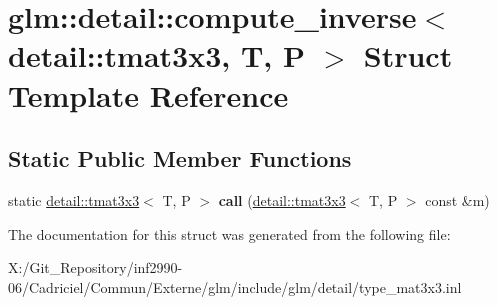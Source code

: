\hypertarget{structglm_1_1detail_1_1compute__inverse_3_01detail_1_1tmat3x3_00_01_t_00_01_p_01_4}{\section{glm\-:\-:detail\-:\-:compute\-\_\-inverse$<$ detail\-:\-:tmat3x3, T, P $>$ Struct Template Reference}
\label{structglm_1_1detail_1_1compute__inverse_3_01detail_1_1tmat3x3_00_01_t_00_01_p_01_4}
}
\subsection*{Static Public Member Functions}
\begin{DoxyCompactItemize}
\item 
\hypertarget{structglm_1_1detail_1_1compute__inverse_3_01detail_1_1tmat3x3_00_01_t_00_01_p_01_4_ac49eb426ffee6a5ebf1ee02e45c0a159}{static \hyperlink{structglm_1_1detail_1_1tmat3x3}{detail\-::tmat3x3}$<$ T, P $>$ {\bfseries call} (\hyperlink{structglm_1_1detail_1_1tmat3x3}{detail\-::tmat3x3}$<$ T, P $>$ const \&m)}\label{structglm_1_1detail_1_1compute__inverse_3_01detail_1_1tmat3x3_00_01_t_00_01_p_01_4_ac49eb426ffee6a5ebf1ee02e45c0a159}

\end{DoxyCompactItemize}


The documentation for this struct was generated from the following file\-:\begin{DoxyCompactItemize}
\item 
X\-:/\-Git\-\_\-\-Repository/inf2990-\/06/\-Cadriciel/\-Commun/\-Externe/glm/include/glm/detail/type\-\_\-mat3x3.\-inl\end{DoxyCompactItemize}
